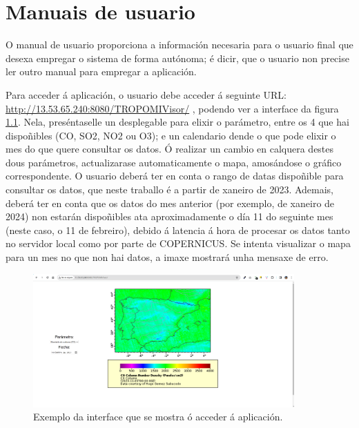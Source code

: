\chapter{Manuais de usuario}

O manual de usuario proporciona a información necesaria para o usuario final que desexa empregar o sistema de forma autónoma; é dicir, que o usuario non precise ler outro manual para empregar a
aplicación.

Para acceder á aplicación, o usuario debe acceder á seguinte URL: \url{http://13.53.65.240:8080/TROPOMIVisor/} , podendo ver a interface da figura \ref{fig:interfaz}. Nela, preséntaselle un
desplegable para elixir o parámetro, entre os 4 que hai dispoñibles (CO, SO2, NO2 ou O3); e un calendario dende o que pode elixir o mes do que quere consultar os datos. Ó realizar un cambio en
calquera destes dous parámetros, actualizarase automaticamente o mapa, amosándose o gráfico correspondente. O usuario deberá ter en conta o rango de datas dispoñible para consultar os datos, que
neste traballo é a partir de xaneiro de 2023. Ademais, deberá ter en conta que os datos do mes anterior (por exemplo, de xaneiro de 2024) non estarán dispoñibles ata aproximadamente o día 11 do
seguinte mes (neste caso, o 11 de febreiro), debido á latencia á hora de procesar os datos tanto no servidor local como por parte de COPERNICUS. Se intenta visualizar o mapa para un mes no que non
hai datos, a imaxe mostrará unha mensaxe de erro.

\begin{figure}
    \centerline{\includegraphics[width=10cm]{figuras/interfaz.png}}
    \caption{Exemplo da interface que se mostra ó acceder á aplicación.}
    \label{fig:interfaz}
\end{figure}
